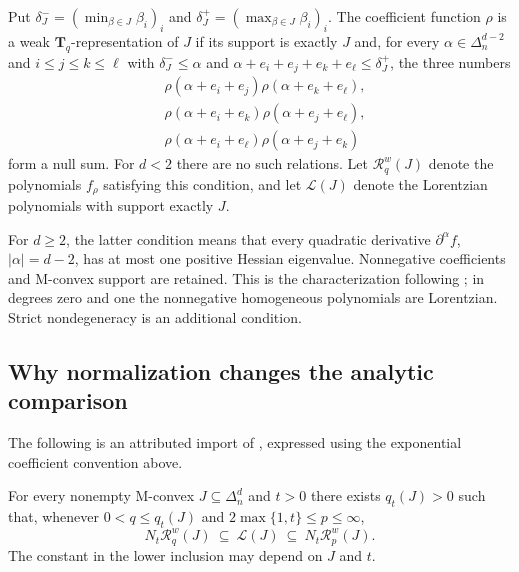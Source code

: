 \begin{definition}
\label{def:appH-triangular-weak-representation}
Put $\delta_J^-=(\min_{\beta\in J}\beta_i)_i$ and
$\delta_J^+=(\max_{\beta\in J}\beta_i)_i$.
The coefficient function $\rho$ is a weak $\mathbf T_q$-representation
of $J$ if its support is exactly $J$ and, for every
$\alpha\in\Delta_n^{d-2}$ and $i\leq j\leq k\leq\ell$ with
$\delta_J^-\leq\alpha$ and
$\alpha+e_i+e_j+e_k+e_\ell\leq\delta_J^+$, the three numbers
\begin{equation*}
 \begin{aligned}
 &\rho(\alpha+e_i+e_j)\rho(\alpha+e_k+e_\ell),\\
 &\rho(\alpha+e_i+e_k)\rho(\alpha+e_j+e_\ell),\\
 &\rho(\alpha+e_i+e_\ell)\rho(\alpha+e_j+e_k)
 \end{aligned}
 \tag{H.98}\label{eq:appH-triangular-three-products}
\end{equation*}
form a null sum. For $d<2$ there are no such relations.
Let $\mathcal R_q^w(J)$ denote the polynomials $f_\rho$ satisfying
this condition, and let $\mathcal L(J)$ denote the Lorentzian
polynomials with support exactly $J$.
\end{definition}

For $d\geq2$, the latter condition means that every quadratic
derivative $\partial^\alpha f$, $|\alpha|=d-2$, has at most one
positive Hessian eigenvalue. Nonnegative coefficients and M-convex
support are retained. This is the characterization following
\cite[Theorem~2.25]{BrandenHuh20Lorentzian}; in degrees zero and
one the nonnegative homogeneous polynomials are Lorentzian.
Strict nondegeneracy is an additional condition.

\subsection{Why normalization changes the analytic comparison}
\label{sec:appH-triangular-sandwich}

The following is an attributed import of
\cite[Theorem~5.1]{BakerHuhKummerLorscheid26AnalyticV2}, expressed
using the exponential coefficient convention above.

\begin{theorem}
\label{thm:appH-triangular-sandwich}
For every nonempty M-convex $J\subseteq\Delta_n^d$ and $t>0$
there exists $q_t(J)>0$ such that, whenever
$0<q\leq q_t(J)$ and $2\max\{1,t\}\leq p\leq\infty$,
\begin{equation*}
 N_t\mathcal R_q^w(J)\ \subseteq\ \mathcal L(J)
       \ \subseteq\ N_t\mathcal R_p^w(J).
 \tag{H.99}\label{eq:appH-triangular-sandwich}
\end{equation*}
The constant in the lower inclusion may depend on $J$ and $t$.
\end{theorem}

